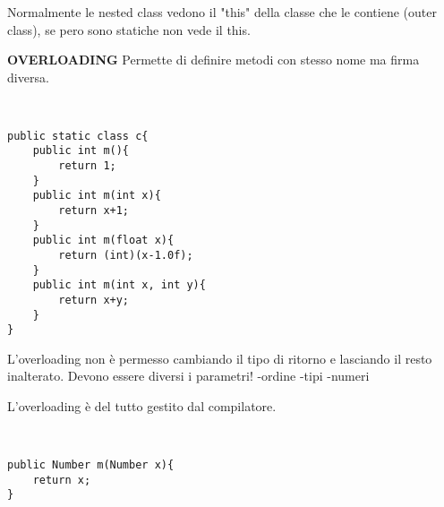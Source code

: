 Normalmente le nested class vedono il "this" della classe che le contiene (outer class), se pero sono statiche non vede il this.






\noindent \textbf{OVERLOADING} \newline
Permette di definire metodi con stesso nome ma firma diversa. 



\begin{lstlisting}[basicstyle=\small,]


public static class c{
	public int m(){
		return 1;
	}
	public int m(int x){
		return x+1;
	}
	public int m(float x){
		return (int)(x-1.0f);
	}
	public int m(int x, int y){
		return x+y;
	}		
}

\end{lstlisting}

\noindent L'overloading non è permesso cambiando il tipo di ritorno e lasciando il resto inalterato. Devono essere diversi i parametri! \newline
-ordine \newline
-tipi \newline
-numeri \newline

\noindent L'overloading è del tutto gestito dal compilatore.

\begin{lstlisting}[basicstyle=\small,]


public Number m(Number x){
	return x;
}

\end{lstlisting}























